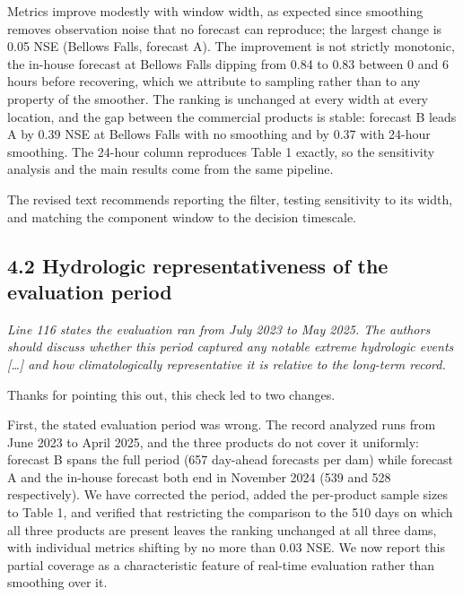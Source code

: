 \documentclass[11pt]{article}
\newenvironment{rc}%
  {\begin{list}{}{\setlength{\leftmargin}{1.5em}\setlength{\rightmargin}{1.5em}%
   \setlength{\topsep}{0.2em}\setlength{\parsep}{0pt}\setlength{\itemsep}{0pt}}%
   \item[]\itshape\color{quotegray}}%
  {\end{list}}
\begin{document}
Metrics improve modestly with window width, as expected since smoothing removes observation noise
that no forecast can reproduce; the largest change is 0.05 NSE (Bellows Falls, forecast A). The
improvement is not strictly monotonic, the in-house forecast at Bellows Falls dipping from 0.84 to
0.83 between 0 and 6 hours before recovering, which we attribute to sampling rather than to any
property of the smoother. The ranking is unchanged at every width at every location, and the gap
between the commercial products is stable: forecast B leads A by 0.39 NSE at Bellows Falls with no
smoothing and by 0.37 with 24-hour smoothing. The 24-hour column reproduces Table 1 exactly, so the
sensitivity analysis and the main results come from the same pipeline.

The revised text recommends reporting the filter, testing sensitivity to its width, and matching
the component window to the decision timescale.

\subsection*{4.2 Hydrologic representativeness of the evaluation period}

\begin{rc}
Line 116 states the evaluation ran from July 2023 to May 2025. The authors should discuss whether
this period captured any notable extreme hydrologic events [\ldots] and how climatologically
representative it is relative to the long-term record.
\end{rc}

Thanks for pointing this out, this check led to two changes.

First, the stated evaluation period was wrong. The record analyzed runs from June 2023 to April 2025, and the
three products do not cover it uniformly: forecast B spans the full period (657 day-ahead forecasts
per dam) while forecast A and the in-house forecast both end in November 2024 (539 and 528
respectively). We have corrected the period, added the per-product sample sizes to Table 1, and
verified that restricting the comparison to the 510 days on which all three products are present
leaves the ranking unchanged at all three dams, with individual metrics shifting by no more than
0.03 NSE. We now report this partial coverage as a characteristic feature of real-time evaluation
rather than smoothing over it.
\end{document}
